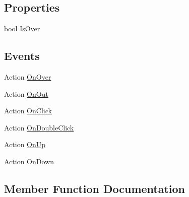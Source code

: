 \subsection*{Properties}
\begin{DoxyCompactItemize}
\item 
bool \mbox{\hyperlink{class_v_r_standard_assets_1_1_utils_1_1_v_r_interactive_item_adb4ca6b121df177d23e29a4a65710c88}{Is\+Over}}
\end{DoxyCompactItemize}
\subsection*{Events}
\begin{DoxyCompactItemize}
\item 
Action \mbox{\hyperlink{class_v_r_standard_assets_1_1_utils_1_1_v_r_interactive_item_adf8b51724cbf6c291d87325b291cd629}{On\+Over}}
\item 
Action \mbox{\hyperlink{class_v_r_standard_assets_1_1_utils_1_1_v_r_interactive_item_aec12562b1b1948fed1a0367e15285921}{On\+Out}}
\item 
Action \mbox{\hyperlink{class_v_r_standard_assets_1_1_utils_1_1_v_r_interactive_item_a854b55cdbd774effd124fa7043c67d6e}{On\+Click}}
\item 
Action \mbox{\hyperlink{class_v_r_standard_assets_1_1_utils_1_1_v_r_interactive_item_a853961da1eba1b011ff7c511227ca0ba}{On\+Double\+Click}}
\item 
Action \mbox{\hyperlink{class_v_r_standard_assets_1_1_utils_1_1_v_r_interactive_item_af846c665a89a2b7859079d13d4c09147}{On\+Up}}
\item 
Action \mbox{\hyperlink{class_v_r_standard_assets_1_1_utils_1_1_v_r_interactive_item_a577be4607fd8102a068b50bafda3f032}{On\+Down}}
\end{DoxyCompactItemize}


\subsection{Member Function Documentation}
\mbox{\label{class_v_r_standard_assets_1_1_utils_1_1_v_r_interactive_item_a99c465d86dac6aee9da60e8fe158d481}} 
